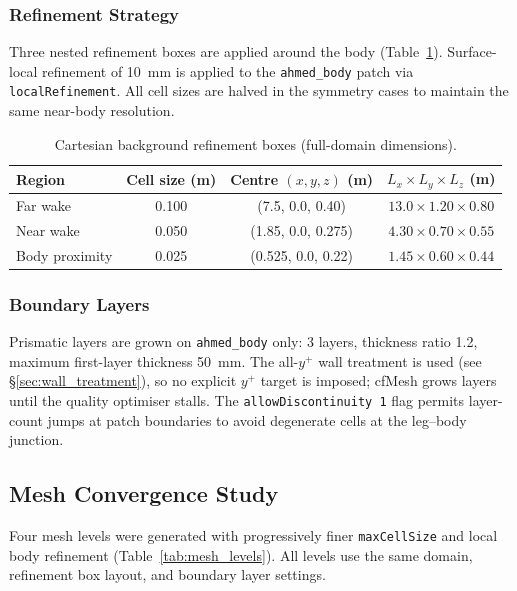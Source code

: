 \subsubsection{Refinement Strategy}

Three nested refinement boxes are applied around the body (Table~\ref{tab:refinement_boxes}). Surface-local refinement of 10~mm is applied to the \texttt{ahmed\_body} patch via \texttt{localRefinement}. All cell sizes are halved in the symmetry cases to maintain the same near-body resolution.

\begin{table}[h]
    \centering
    \caption{Cartesian background refinement boxes (full-domain dimensions).}
    \label{tab:refinement_boxes}
    \begin{tabular}{lccc}
        \toprule
        Region & Cell size (m) & Centre $(x, y, z)$ (m) & $L_x \times L_y \times L_z$ (m) \\
        \midrule
        Far wake      & 0.100 & (7.5, 0.0, 0.40)   & $13.0 \times 1.20 \times 0.80$ \\
        Near wake     & 0.050 & (1.85, 0.0, 0.275) & $4.30 \times 0.70 \times 0.55$ \\
        Body proximity & 0.025 & (0.525, 0.0, 0.22) & $1.45 \times 0.60 \times 0.44$ \\
        \bottomrule
    \end{tabular}
\end{table}

\subsubsection{Boundary Layers}

Prismatic layers are grown on \texttt{ahmed\_body} only: 3 layers, thickness ratio 1.2, maximum first-layer thickness 50~mm. The all-$y^+$ wall treatment is used (see \S\ref{sec:wall_treatment}), so no explicit $y^+$ target is imposed; cfMesh grows layers until the quality optimiser stalls. The \texttt{allowDiscontinuity 1} flag permits layer-count jumps at patch boundaries to avoid degenerate cells at the leg--body junction.

\subsection{Mesh Convergence Study}
\label{sec:mesh_convergence}

Four mesh levels were generated with progressively finer \texttt{maxCellSize} and local body refinement (Table~\ref{tab:mesh_levels}). All levels use the same domain, refinement box layout, and boundary layer settings.

